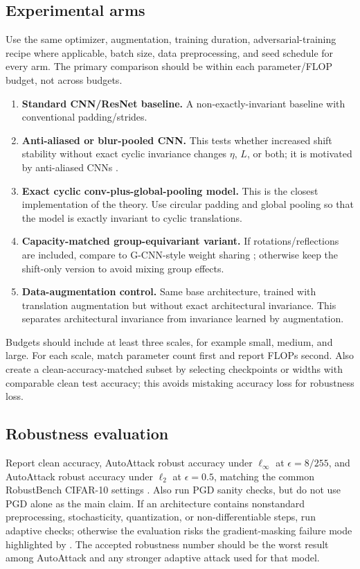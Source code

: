 \documentclass[11pt]{article}
\theoremstyle{plain}
\theoremstyle{definition}
\theoremstyle{remark}
\begin{document}
\subsection{Experimental arms}
Use the same optimizer, augmentation, training duration, adversarial-training recipe where applicable, batch size, data preprocessing, and seed schedule for every arm.  The primary comparison should be within each parameter/FLOP budget, not across budgets.
\begin{enumerate}[leftmargin=1.4em]
\item \textbf{Standard CNN/ResNet baseline.}  A non-exactly-invariant baseline with conventional padding/strides.
\item \textbf{Anti-aliased or blur-pooled CNN.}  This tests whether increased shift stability without exact cyclic invariance changes $\eta$, $L$, or both; it is motivated by anti-aliased CNNs \citep{Zhang2019}.
\item \textbf{Exact cyclic conv-plus-global-pooling model.}  This is the closest implementation of the theory.  Use circular padding and global pooling so that the model is exactly invariant to cyclic translations.
\item \textbf{Capacity-matched group-equivariant variant.}  If rotations/reflections are included, compare to G-CNN-style weight sharing \citep{CohenWelling2016}; otherwise keep the shift-only version to avoid mixing group effects.
\item \textbf{Data-augmentation control.}  Same base architecture, trained with translation augmentation but without exact architectural invariance.  This separates architectural invariance from invariance learned by augmentation.
\end{enumerate}

Budgets should include at least three scales, for example small, medium, and large.  For each scale, match parameter count first and report FLOPs second.  Also create a clean-accuracy-matched subset by selecting checkpoints or widths with comparable clean test accuracy; this avoids mistaking accuracy loss for robustness loss.

\subsection{Robustness evaluation}
Report clean accuracy, AutoAttack robust accuracy under $\ell_\infty$ at $\epsilon=8/255$, and AutoAttack robust accuracy under $\ell_2$ at $\epsilon=0.5$, matching the common RobustBench CIFAR-10 settings \citep{RobustBench2020}.  Also run PGD sanity checks, but do not use PGD alone as the main claim.  If an architecture contains nonstandard preprocessing, stochasticity, quantization, or non-differentiable steps, run adaptive checks; otherwise the evaluation risks the gradient-masking failure mode highlighted by \citet{Athalye2018,Carlini2019}.  The accepted robustness number should be the worst result among AutoAttack and any stronger adaptive attack used for that model.
\end{document}
